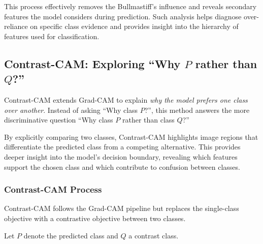 \documentclass{article}
\begin{document}
This process effectively removes the Bullmastiff’s influence and reveals secondary features the model considers during prediction. Such analysis helps diagnose over-reliance on specific class evidence and provides insight into the hierarchy of features used for classification.

\subsection{Contrast-CAM: Exploring ``Why $P$ rather than $Q$?''}

Contrast-CAM extends Grad-CAM to explain \emph{why the model prefers one class over another}. 
Instead of asking “Why class $P$?”, this method answers the more discriminative question 
``Why class $P$ rather than class $Q$?''

By explicitly comparing two classes, Contrast-CAM highlights image regions that differentiate the predicted class from a competing alternative. This provides deeper insight into the model’s decision boundary, revealing which features support the chosen class and which contribute to confusion between classes.

\subsubsection*{Contrast-CAM Process}

Contrast-CAM follows the Grad-CAM pipeline but replaces the single-class objective with a contrastive objective between two classes.

Let \(P\) denote the predicted class and \(Q\) a contrast class.
\end{document}
